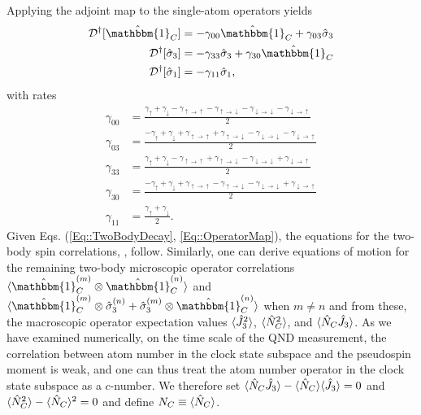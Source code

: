 \documentclass[aps,pra,twocolumn]{revtex4-1} %
\newcommand{\gammauu}{\gamma_{\uparrow \rightarrow \uparrow}}
\newcommand{\gammadd}{\gamma_{\downarrow \rightarrow \downarrow}}
\newcommand{\gammaud}{\gamma_{\uparrow \rightarrow \downarrow}}
\newcommand{\gammadu}{\gamma_{\downarrow \rightarrow \uparrow}}
\begin{document}
\begin{appendix}
Applying the adjoint map to the single-atom operators yields 
	\begin{subequations} \label{Eq::OperatorMap}
	\begin{align}
		\mathcal{D}\dg[\hat{\mathbbm{1}}_C] & = - \gamma_{00} \hat{\mathbbm{1}}_C +\gamma_{03} \hat{\sigma}_3 \label {Eq::Idecay} \\
		\mathcal{D}\dg[\hat{\sigma}_3] & =- \gamma_{33} \hat{\sigma}_3 +  \gamma_{30} \hat{\mathbbm{1}}_C 
\label{Eq::zdecay} \\
		\mathcal{D}\dg[\hat{\sigma}_1] & = - \gamma_{11} \hat{\sigma}_1\label{Eq::xdecay},
	\end{align}
	\end{subequations}
with rates	
	\begin{subequations} \label{Eq::DecayRates}
	\begin{align}
		\gamma_{00} 
			& = \frac{\gamma_{\uparrow}+\gamma_{\downarrow} - \gammauu-\gammaud  -\gammadd-\gammadu}{2} \label{Eq::lrate} \\
			\gamma_{03} 
			& = \frac{-\gamma_{\uparrow}+\gamma_{\downarrow} +\gammauu + \gammaud - \gammadd - \gammadu }{2}\\		
		\gamma_{33} 
			& = \frac{\gamma_{\uparrow}+\gamma_{\downarrow} - \gammauu+\gammaud  -\gammadd+\gammadu}{2}\\
			\gamma_{30} 
			& = \frac{-\gamma_{\uparrow} + \gamma_{\downarrow} + \gammauu - \gammaud - \gammadd + \gammadu }{2} \\
			\gamma_{11} 
			& = \frac{\gamma_{\uparrow}+\gamma_{\downarrow}}{2}. \label{Eq::frate}
	\end{align}
	\end{subequations}
Given Eqs. (\ref{Eq::TwoBodyDecay}, \ref{Eq::OperatorMap}), the equations for the two-body spin correlations, , follow.  Similarly, one can derive equations of motion for the remaining two-body microscopic operator correlations $ \expt{\hat{\mathbbm{1}}^{(m)}_C \otimes \hat{\mathbbm{1}}^{(n)}_C} $ and $ \expt{\hat{\mathbbm{1}}^{(m)}_C \otimes \hat{\sigma}_3^{(n)} + \hat{\sigma}_3^{(m)} \otimes \hat{\mathbbm{1}}^{(n)}_C } $ when $ m\neq n $ and from these, the macroscopic operator expectation values $ \langle{\hat{J}_3^2}\rangle $, $ \langle{\hat{N}_C^2}\rangle $, and $ \langle{\hat{N}_C\hat{J}_3}\rangle $.  As we have examined numerically, on the time scale of the QND measurement, the correlation between atom number in the clock state subspace and the pseudospin moment is weak, and one can thus treat the atom number operator in the clock state subspace as a $c$-number.
We therefore set $ \langle{\hat{N}_C\hat{J}_3}\rangle-\langle{\hat{N}_C}\rangle\langle{\hat{J}_3}\rangle = 0 $ and $ \langle{\hat{N}_C^2}\rangle - \langle{\hat{N}_C}\rangle^2 = 0 $ and define $ N_C\equiv \langle{\hat{N}_C}\rangle$. 


\end{appendix}
\end{document}
